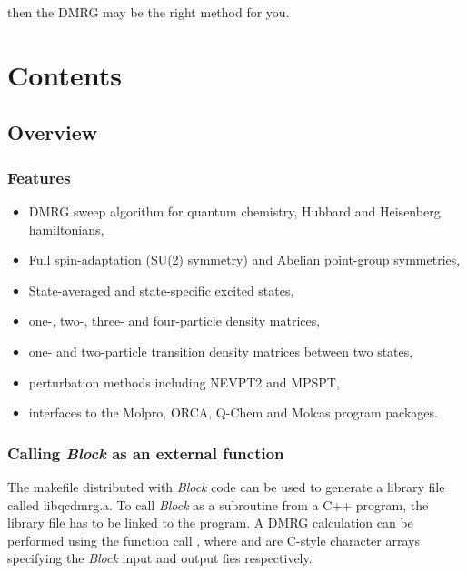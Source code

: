 \documentclass[letterpaper,10pt,english]{sphinxmanual}
\begin{document}
then the DMRG may be the right method for you.


\chapter{Contents}
\label{index:contents}\label{index:welcome-to-block-s-documentation}

\section{Overview}
\label{overview:overview}\label{overview::doc}

\subsection{Features}
\label{overview:features}\begin{itemize}
\item {} 
DMRG sweep algorithm for quantum chemistry, Hubbard and Heisenberg hamiltonians,

\item {} 
Full spin-adaptation (SU(2) symmetry) and Abelian point-group symmetries,

\item {} 
State-averaged and state-specific excited states,

\item {} 
one-, two-, three- and four-particle density matrices,

\item {} 
one- and two-particle transition density matrices between two states,

\item {} 
perturbation methods including NEVPT2 and MPSPT,

\item {} 
interfaces to the Molpro, ORCA, Q-Chem and Molcas program packages.

\end{itemize}


\subsection{Calling \emph{Block} as an external function}
\label{overview:calling-block-as-an-external-function}
The makefile distributed with \emph{Block} code can be used to generate a library file called
libqcdmrg.a.
To call \emph{Block} as a subroutine from a C++ program, the library file has to be
linked to the program.
A DMRG calculation can be performed using the function call ,
where  and  are C-style character arrays specifying the \emph{Block} input and output fies respectively.
\end{document}
